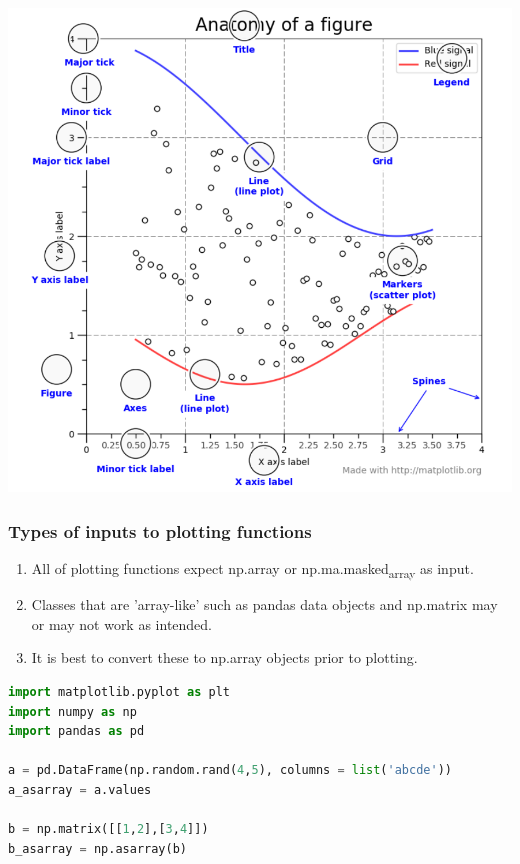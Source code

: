 \documentclass[UTF8,a4paper,12pt]{ctexart}  %
\providecommand{\tightlist}{\setlength{\itemsep}{0pt}\setlength{\parskip}{0pt}}
\begin{document}
\includegraphics{images/1580807106.png}

\hypertarget{types-of-inputs-to-plotting-functions}{%
\subsubsection{Types of inputs to plotting functions}\label{types-of-inputs-to-plotting-functions}}

\begin{enumerate}
\def\labelenumi{\arabic{enumi}.}
\tightlist
\item
  All of plotting functions expect np.array or np.ma.masked\textsubscript{array} as
  input.
\item
  Classes that are 'array-like' such as pandas data objects and
  np.matrix may or may not work as intended.
\item
  It is best to convert these to np.array objects prior to plotting.
\end{enumerate}

\begin{lstlisting}[language=Python]
import matplotlib.pyplot as plt
import numpy as np
import pandas as pd

a = pd.DataFrame(np.random.rand(4,5), columns = list('abcde'))
a_asarray = a.values

b = np.matrix([[1,2],[3,4]])
b_asarray = np.asarray(b)
\end{lstlisting}
\end{document}
